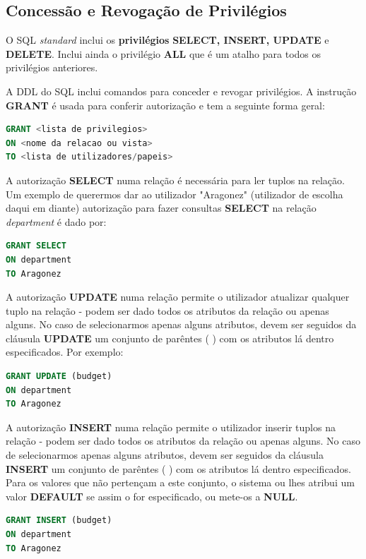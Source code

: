 \documentclass[oneside]{book}
\theoremstyle{definition}
\begin{document}
\subsection{Concessão e Revogação de Privilégios}
O SQL \textit{standard} inclui os \textbf{privilégios} \textbf{SELECT, INSERT, UPDATE} e \textbf{DELETE}. Inclui ainda o privilégio \textbf{ALL} que é um atalho para todos os privilégios anteriores.

A DDL do SQL inclui comandos para conceder e revogar privilégios. A instrução \textbf{GRANT} é usada para conferir autorização e tem a seguinte forma geral:
\begin{lstlisting}[language=SQL, morekeywords={REFERENCES, REFRESH, MATERIALIZED, CONCURRENTLY}, framesep=8pt, xleftmargin=40pt, framexleftmargin=40pt, frame=tb, framerule=0pt]
GRANT <lista de privilegios>
ON <nome da relacao ou vista>
TO <lista de utilizadores/papeis>
\end{lstlisting}

A autorização \textbf{SELECT} numa relação é necessária para ler tuplos na relação. Um exemplo de querermos dar ao utilizador "Aragonez" (utilizador de escolha daqui em diante) autorização para fazer consultas \textbf{SELECT} na relação \textit{department} é dado por:
\begin{lstlisting}[language=SQL, morekeywords={REFERENCES, TO}, framesep=8pt, xleftmargin=40pt, framexleftmargin=40pt, frame=tb, framerule=0pt]
GRANT SELECT
ON department
TO Aragonez
\end{lstlisting}

A autorização \textbf{UPDATE} numa relação permite o utilizador atualizar qualquer tuplo na relação - podem ser dado todos os atributos da relação ou apenas alguns. No caso de selecionarmos apenas alguns atributos, devem ser seguidos da cláusula \textbf{UPDATE} um conjunto de parêntes ( ) com os atributos lá dentro especificados. Por exemplo:
\begin{lstlisting}[language=SQL, morekeywords={REFERENCES, TO}, framesep=8pt, xleftmargin=40pt, framexleftmargin=40pt, frame=tb, framerule=0pt]
GRANT UPDATE (budget)
ON department
TO Aragonez
\end{lstlisting}

A autorização \textbf{INSERT} numa relação permite o utilizador inserir tuplos na relação - podem ser dado todos os atributos da relação ou apenas alguns. No caso de selecionarmos apenas alguns atributos, devem ser seguidos da cláusula \textbf{INSERT} um conjunto de parêntes ( ) com os atributos lá dentro especificados. Para os valores que não pertençam a este conjunto, o sistema ou lhes atribui um valor \textbf{DEFAULT} se assim o for especificado, ou mete-os a \textbf{NULL}.
\begin{lstlisting}[language=SQL, morekeywords={REFERENCES, TO}, framesep=8pt, xleftmargin=40pt, framexleftmargin=40pt, frame=tb, framerule=0pt]
GRANT INSERT (budget)
ON department
TO Aragonez
\end{lstlisting}
\end{document}
